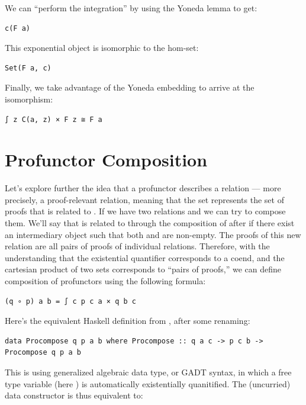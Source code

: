 We can ``perform the integration'' by using the Yoneda lemma to get:

\begin{verbatim}
c(F a)
\end{verbatim}

This exponential object is isomorphic to the hom-set:

\begin{verbatim}
Set(F a, c)
\end{verbatim}

Finally, we take advantage of the Yoneda embedding to arrive at the
isomorphism:

\begin{verbatim}
∫ z C(a, z) × F z ≅ F a
\end{verbatim}

\section{Profunctor Composition}\label{profunctor-composition}

Let's explore further the idea that a profunctor describes a relation
--- more precisely, a proof-relevant relation, meaning that the set
 represents the set of proofs that  is related
to . If we have two relations  and  we can
try to compose them. We'll say that  is related to 
through the composition of  after  if there exist an
intermediary object  such that both  and
 are non-empty. The proofs of this new relation are all
pairs of proofs of individual relations. Therefore, with the
understanding that the existential quantifier corresponds to a coend,
and the cartesian product of two sets corresponds to ``pairs of
proofs,'' we can define composition of profunctors using the following
formula:

\begin{verbatim}
(q ∘ p) a b = ∫ c p c a × q b c
\end{verbatim}

Here's the equivalent Haskell definition from
, after some renaming:

\begin{verbatim}
data Procompose q p a b where Procompose :: q a c -> p c b -> Procompose q p a b 
\end{verbatim}

This is using generalized algebraic data type, or GADT syntax, in which
a free type variable (here ) is automatically existentially
quanitified. The (uncurried) data constructor  is
thus equivalent to:


